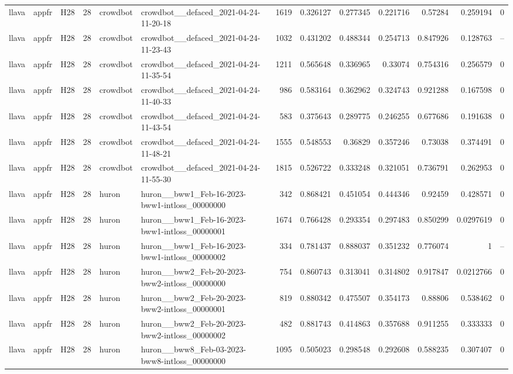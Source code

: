 \begin{longtable}{lllrllrrrrrrr}
llava & appfr & H28 & 28 & crowdbot & crowdbot\_\_defaced\_2021-04-24-11-20-18 & 1619 & 0.326127 & 0.277345 & 0.221716 & 0.57284 & 0.259194 & 0 \\
llava & appfr & H28 & 28 & crowdbot & crowdbot\_\_defaced\_2021-04-24-11-23-43 & 1032 & 0.431202 & 0.488344 & 0.254713 & 0.847926 & 0.128763 & -- \\
llava & appfr & H28 & 28 & crowdbot & crowdbot\_\_defaced\_2021-04-24-11-35-54 & 1211 & 0.565648 & 0.336965 & 0.33074 & 0.754316 & 0.256579 & 0 \\
llava & appfr & H28 & 28 & crowdbot & crowdbot\_\_defaced\_2021-04-24-11-40-33 & 986 & 0.583164 & 0.362962 & 0.324743 & 0.921288 & 0.167598 & 0 \\
llava & appfr & H28 & 28 & crowdbot & crowdbot\_\_defaced\_2021-04-24-11-43-54 & 583 & 0.375643 & 0.289775 & 0.246255 & 0.677686 & 0.191638 & 0 \\
llava & appfr & H28 & 28 & crowdbot & crowdbot\_\_defaced\_2021-04-24-11-48-21 & 1555 & 0.548553 & 0.36829 & 0.357246 & 0.73038 & 0.374491 & 0 \\
llava & appfr & H28 & 28 & crowdbot & crowdbot\_\_defaced\_2021-04-24-11-55-30 & 1815 & 0.526722 & 0.333248 & 0.321051 & 0.736791 & 0.262953 & 0 \\
llava & appfr & H28 & 28 & huron & huron\_\_bww1\_Feb-16-2023-bww1-intloss\_00000000 & 342 & 0.868421 & 0.451054 & 0.444346 & 0.92459 & 0.428571 & 0 \\
llava & appfr & H28 & 28 & huron & huron\_\_bww1\_Feb-16-2023-bww1-intloss\_00000001 & 1674 & 0.766428 & 0.293354 & 0.297483 & 0.850299 & 0.0297619 & 0 \\
llava & appfr & H28 & 28 & huron & huron\_\_bww1\_Feb-16-2023-bww1-intloss\_00000002 & 334 & 0.781437 & 0.888037 & 0.351232 & 0.776074 & 1 & -- \\
llava & appfr & H28 & 28 & huron & huron\_\_bww2\_Feb-20-2023-bww2-intloss\_00000000 & 754 & 0.860743 & 0.313041 & 0.314802 & 0.917847 & 0.0212766 & 0 \\
llava & appfr & H28 & 28 & huron & huron\_\_bww2\_Feb-20-2023-bww2-intloss\_00000001 & 819 & 0.880342 & 0.475507 & 0.354173 & 0.88806 & 0.538462 & 0 \\
llava & appfr & H28 & 28 & huron & huron\_\_bww2\_Feb-20-2023-bww2-intloss\_00000002 & 482 & 0.881743 & 0.414863 & 0.357688 & 0.911255 & 0.333333 & 0 \\
llava & appfr & H28 & 28 & huron & huron\_\_bww8\_Feb-03-2023-bww8-intloss\_00000000 & 1095 & 0.505023 & 0.298548 & 0.292608 & 0.588235 & 0.307407 & 0 \\

\end{longtable}
